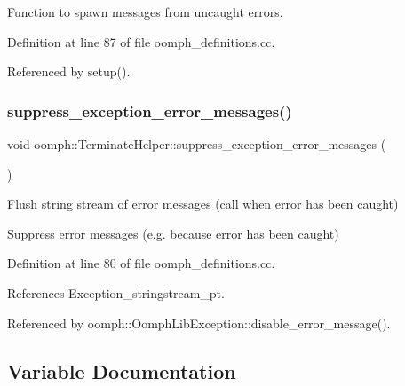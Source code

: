 Function to spawn messages from uncaught errors. 



Definition at line 87 of file oomph\+\_\+definitions.\+cc.



Referenced by setup().

\mbox{\label{namespaceoomph_1_1TerminateHelper_a2b5ff4c65cd6891d1852d18ff4b8d9ff}} 
\subsubsection{\texorpdfstring{suppress\+\_\+exception\+\_\+error\+\_\+messages()}{suppress\_exception\_error\_messages()}}
{\footnotesize\ttfamily void oomph\+::\+Terminate\+Helper\+::suppress\+\_\+exception\+\_\+error\+\_\+messages (\begin{DoxyParamCaption}{ }\end{DoxyParamCaption})}



Flush string stream of error messages (call when error has been caught) 

Suppress error messages (e.\+g. because error has been caught) 

Definition at line 80 of file oomph\+\_\+definitions.\+cc.



References Exception\+\_\+stringstream\+\_\+pt.



Referenced by oomph\+::\+Oomph\+Lib\+Exception\+::disable\+\_\+error\+\_\+message().



\subsection{Variable Documentation}
\mbox{\label{namespaceoomph_1_1TerminateHelper_af6addb95de25061844f952c23999d2bb}} 
